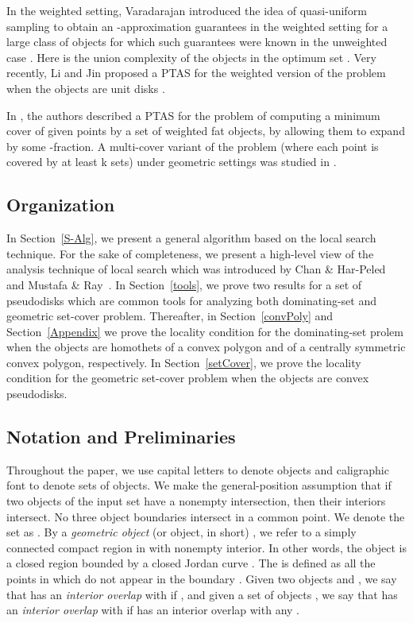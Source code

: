 \documentclass[a4paper,11pt]{article}
\begin{document}
In the weighted setting, 
Varadarajan 
introduced the idea of quasi-uniform 
sampling to obtain {an} -approximation guarantees in the weighted 
setting 
for 
a large class of objects for which such guarantees were known in the 
{unweighted} case \cite{Varada}.  Here   is the union complexity of 
the objects in the optimum set . Very recently, Li and Jin  proposed a 
PTAS   for {the}
weighted version of the problem when the objects are unit disks \cite{LiJ}.
 
 
In \cite{HarPel12}, {the} authors  described a 
PTAS for the problem {of} computing a minimum cover of given points by a set of 
weighted fat objects, by allowing them to expand by some -fraction.
  A 
{multi-cover variant of the problem (where each point is covered by at least k sets)} under 
geometric settings was studied in \cite{Chekuri}.

\subsection{Organization}

In Section~\ref{S-Alg}, we present a general  
algorithm based on the local search technique. For the sake of 
completeness, we present a high-level view of the analysis technique of local search
which was introduced by Chan \& 
Har-Peled~\cite{ChanH09} and Mustafa \& Ray~\cite{MustafaR10}.
In Section~\ref{tools}, we prove two results for a set of  pseudodisks 
which 
are common tools for analyzing both dominating-set and geometric set-cover 
problem. 
Thereafter, in 
Section~\ref{convPoly} and Section~\ref{Appendix} we prove    the locality condition 
for the dominating-set prolem when the objects are homothets of a convex polygon and of a centrally symmetric convex polygon, respectively.  In Section~\ref{setCover}, we prove the locality condition for {the} geometric set-cover problem when the  objects are convex  pseudodisks.

\subsection{{Notation and Preliminaries}}
Throughout the paper, we use capital  {letters to denote objects} and
 caligraphic font to denote   {sets of objects}.  {We make the general-position assumption that if two objects of the input set have a nonempty intersection, then their interiors intersect. No three object boundaries intersect in a common point.}
We denote the set  as .
By a \emph{geometric object} (or object, in short) , 
we 
refer  to a simply connected compact region  in  with nonempty interior. 
In other words, 
the object  is a closed region bounded by a closed 
Jordan curve . The  is defined as all the 
points in  which do not appear in the boundary  . 
Given two objects  and , we say that  has an \emph{interior overlap} with  if , and given a set of objects , we say that  has an \emph{interior overlap} with  if  has an interior overlap with any .
  
\end{document}
